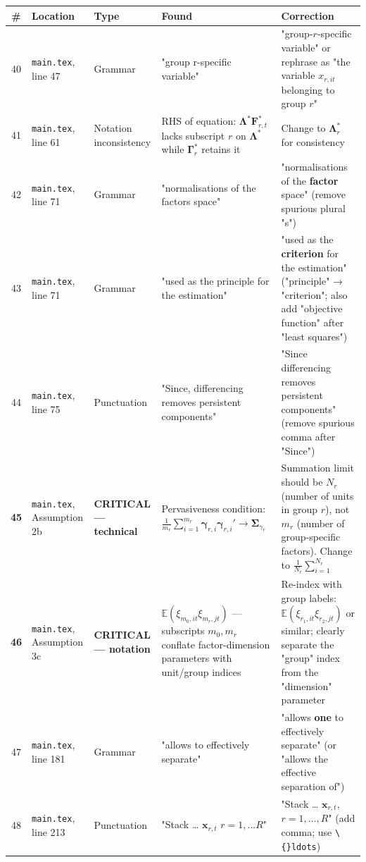\documentclass[11pt,a4paper]{article}
\begin{document}
\begin{longtable}{c p{3.2cm} l p{3.8cm} p{3.5cm}}
\toprule
\textbf{\#} & \textbf{Location} & \textbf{Type} & \textbf{Found} & \textbf{Correction} \\
\midrule
\endhead
40 & \texttt{main.tex}, line 47 & Grammar & "group r-specific variable" & "group-$r$-specific variable" or rephrase as "the variable $x_{r,it}$ belonging to group $r$" \\
41 & \texttt{main.tex}, line 61 & Notation inconsistency & RHS of equation: $\boldsymbol{\Lambda}^*\boldsymbol{F}_{r,t}^*$ lacks subscript $r$ on $\boldsymbol{\Lambda}^*$ while $\boldsymbol{\Gamma}_r^*$ retains it & Change to $\boldsymbol{\Lambda}_r^*$ for consistency \\
42 & \texttt{main.tex}, line 71 & Grammar & "normalisations of the factors space" & "normalisations of the \textbf{factor} space" (remove spurious plural "s") \\
43 & \texttt{main.tex}, line 71 & Grammar & "used as the principle for the estimation" & "used as the \textbf{criterion} for the estimation" ("principle" → "criterion"; also add "objective function" after "least squares") \\
44 & \texttt{main.tex}, line 75 & Punctuation & "Since, differencing removes persistent components" & "Since differencing removes persistent components" (remove spurious comma after "Since") \\
\textbf{45} & \texttt{main.tex}, Assumption 2b & \textbf{CRITICAL — technical} & Pervasiveness condition: $\frac{1}{m_r}\sum_{i=1}^{m_r} \boldsymbol{\gamma}_{r,i}\boldsymbol{\gamma}_{r,i}' \to \boldsymbol{\Sigma}_{\gamma_r}$ & Summation limit should be $N_r$ (number of units in group $r$), not $m_r$ (number of group-specific factors). Change to $\frac{1}{N_r}\sum_{i=1}^{N_r}$ \\
\textbf{46} & \texttt{main.tex}, Assumption 3c & \textbf{CRITICAL — notation} & $\mathbb{E}(\xi_{m_0,it}\xi_{m_r,jt})$ — subscripts $m_0, m_r$ conflate factor-dimension parameters with unit/group indices & Re-index with group labels: $\mathbb{E}(\xi_{r_1,it}\xi_{r_2,jt})$ or similar; clearly separate the "group" index from the "dimension" parameter \\
47 & \texttt{main.tex}, line 181 & Grammar & "allows to effectively separate" & "allows \textbf{one} to effectively separate" (or "allows the effective separation of") \\
48 & \texttt{main.tex}, line 213 & Punctuation & "Stack … $\boldsymbol{x}_{r,t}$ $r=1,...R$" & "Stack … $\boldsymbol{x}_{r,t}$, $r=1,\ldots,R$" (add comma; use \texttt{\textbackslash\{\}ldots}) \\

\end{longtable}
\end{document}
